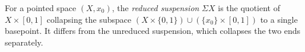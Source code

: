 
For a pointed space $(X,x_0)$, the \emph{reduced suspension} $\Sigma X$ is the quotient of $X\times[0,1]$ collapsing the subspace $(X\times\{0,1\})\cup(\{x_0\}\times[0,1])$ to a single basepoint. It differs from the unreduced suspension, which collapses the two ends separately.
